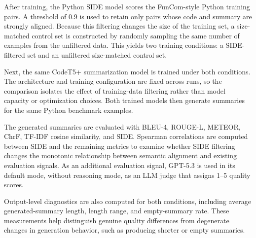 After training, the Python SIDE model scores the FunCom-style Python training pairs. A threshold of 0.9 is used to retain only pairs whose code and summary are strongly aligned. Because this filtering changes the size of the training set, a size-matched control set is constructed by randomly sampling the same number of examples from the unfiltered data. This yields two training conditions: a SIDE-filtered set and an unfiltered size-matched control set.

Next, the same CodeT5+ summarization model is trained under both conditions. The architecture and training configuration are fixed across runs, so the comparison isolates the effect of training-data filtering rather than model capacity or optimization choices. Both trained models then generate summaries for the same Python benchmark examples.

The generated summaries are evaluated with BLEU-4, ROUGE-L, METEOR, ChrF, TF-IDF cosine similarity, and SIDE. Spearman correlations are computed between SIDE and the remaining metrics to examine whether SIDE filtering changes the monotonic relationship between semantic alignment and existing evaluation signals. As an additional evaluation signal, GPT-5.3 is used in its default mode, without reasoning mode, as an LLM judge that assigns 1--5 quality scores.

Output-level diagnostics are also computed for both conditions, including average generated-summary length, length range, and empty-summary rate. These measurements help distinguish genuine quality differences from degenerate changes in generation behavior, such as producing shorter or empty summaries.